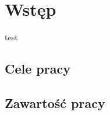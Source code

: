 \chapter{Wstęp}
\label{cha:wprowadzenie}
test
\section{Cele pracy}
\label{sec:celePracy}

\section{Zawartość pracy}
\label{sec: zawartosc_pracy}


















